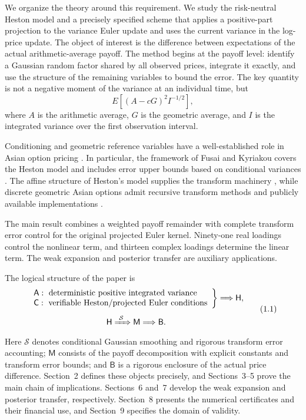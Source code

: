 \documentclass[11pt,a4paper]{article}
\begin{document}
We organize the theory around this requirement. We study the risk-neutral Heston model and a precisely specified scheme that applies a positive-part projection to the variance Euler update and uses the current variance in the log-price update. The object of interest is the difference between expectations of the actual arithmetic-average payoff. The method begins at the payoff level: identify a Gaussian random factor shared by all observed prices, integrate it exactly, and use the structure of the remaining variables to bound the error. The key quantity is not a negative moment of the variance at an individual time, but
\[
E\!\left[(A-cG)^2 I^{-1/2}\right],
\]
where \(A\) is the arithmetic average, \(G\) is the geometric average, and \(I\) is the integrated variance over the first observation interval.

Conditioning and geometric reference variables have a well-established role in Asian option pricing \cite{Curran1994,RogersShi1995,Thompson2002,FusaiKyriakou2016}. In particular, the framework of Fusai and Kyriakou covers the Heston model and includes error upper bounds based on conditional variances \cite{FusaiKyriakou2016}. The affine structure of Heston's model supplies the transform machinery \cite{Heston1993}, while discrete geometric Asian options admit recursive transform methods \cite{KimKimKimWee2016} and publicly available implementations \cite{QuantLibDiscreteGeometricHeston}.

The main result combines a weighted payoff remainder with complete transform
error control for the original projected Euler kernel. Ninety-one real loadings
control the nonlinear term, and thirteen complex loadings determine the linear
term. The weak expansion and posterior transfer are auxiliary applications.

The logical structure of the paper is
\[
\begin{gathered}
\left.
\begin{array}{l}
\mathsf A:\ \text{deterministic positive integrated variance}\\
\mathsf C:\ \text{verifiable Heston/projected Euler conditions}
\end{array}
\right\}\Longrightarrow\mathsf H,\\[4pt]
\mathsf H\xRightarrow{\ \mathcal S\ }\mathsf M\Longrightarrow\mathsf B .
\end{gathered}
\tag{1.1}
\]
Here \(\mathcal S\) denotes conditional Gaussian smoothing and rigorous transform error accounting; \(\mathsf M\) consists of the payoff decomposition with explicit constants and transform error bounds; and \(\mathsf B\) is a rigorous enclosure of the actual price difference. Section~2 defines these objects precisely, and Sections~3--5 prove the main chain of implications. Sections~6 and~7 develop the weak expansion and posterior transfer, respectively. Section~8 presents the numerical certificates and their financial use, and Section~9 specifies the domain of validity.
\end{document}
